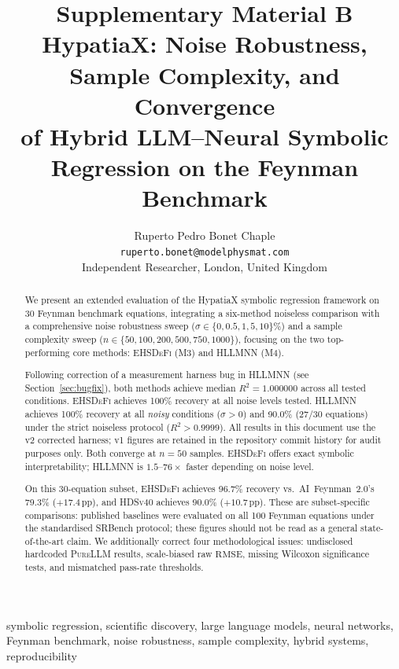 \documentclass[twoside,11pt]{article}
\newcommand{\PureLLM}{\textsc{PureLLM}}
\newcommand{\EHD}{\textsc{EHSDeFi}}
\newcommand{\HSL}{\textsc{HLLMNN}}
\newcommand{\HDS}{\textsc{HDSv40}}
\newcommand{\Rsq}{R^{2}}
\newcommand{\rmse}{\ensuremath{\mathrm{RMSE}}}
\begin{document}
\title{%
  Supplementary Material B\\[6pt]
  HypatiaX: Noise Robustness, Sample Complexity, and Convergence\\
  of Hybrid LLM--Neural Symbolic Regression on the Feynman Benchmark
}
\author{Ruperto Pedro Bonet Chaple\\
  \texttt{ruperto.bonet@modelphysmat.com}\\
  Independent Researcher, London, United Kingdom
}
\editor{}
\maketitle

\begin{abstract}
We present an extended evaluation of the HypatiaX symbolic regression
framework on 30 Feynman benchmark equations, integrating a six-method
noiseless comparison with a comprehensive noise robustness sweep
($\sigma \in \{0, 0.5, 1, 5, 10\}\%$) and a sample complexity sweep
($n \in \{50, 100, 200, 500, 750, 1000\}$), focusing on the two
top-performing core methods: \EHD{} (M3) and \HSL{} (M4).

Following correction of a measurement harness bug in \HSL{} (see
Section~\ref{sec:bugfix}), both methods achieve median $\Rsq = 1.000000$
across all tested conditions.
\EHD{} achieves 100\% recovery at all noise levels tested.
\HSL{} achieves 100\% recovery at all \emph{noisy} conditions ($\sigma > 0$)
and 90.0\% (27/30 equations) under the strict noiseless protocol ($\Rsq > 0.9999$).
All results in this document use the v2 corrected harness; v1 figures are
retained in the repository commit history for audit purposes only.
Both converge at $n = 50$ samples.
\EHD{} offers exact symbolic interpretability; \HSL{} is $1.5$--$76\times$
faster depending on noise level.

On this 30-equation subset, \EHD{} achieves 96.7\% recovery vs.\ AI~Feynman~2.0's
79.3\% ($+17.4$\,pp), and \HDS{} achieves 90.0\% ($+10.7$\,pp).
These are subset-specific comparisons: published baselines were evaluated on
all 100 Feynman equations under the standardised SRBench protocol; these
figures should not be read as a general state-of-the-art claim.
We additionally correct four methodological issues:
undisclosed hardcoded \PureLLM{} results, scale-biased raw \rmse,
missing Wilcoxon significance tests, and mismatched pass-rate thresholds.
\end{abstract}

\begin{keywords}
symbolic regression, scientific discovery, large language models,
neural networks, Feynman benchmark, noise robustness, sample complexity,
hybrid systems, reproducibility
\end{keywords}
\end{document}
